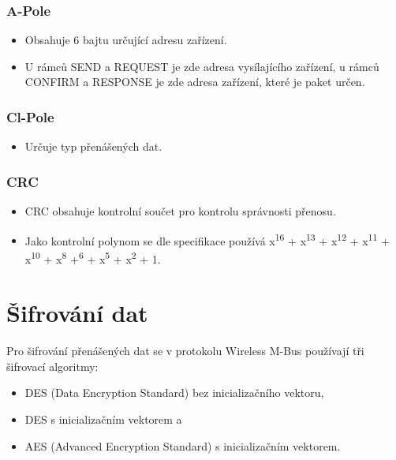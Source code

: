 \subsubsection{A-Pole}
\begin{itemize}
	\item Obsahuje 6 bajtu určující adresu zařízení.
	\item U rámců SEND a REQUEST je zde adresa vysílajícího zařízení, u rámců CONFIRM a RESPONSE je zde adresa zařízení, které je paket určen.
\end{itemize}

\subsubsection{Cl-Pole}
\begin{itemize}
	\item Určuje typ přenášených dat.
\end{itemize}



\subsubsection{CRC}
\begin{itemize}
	\item CRC obsahuje kontrolní součet pro kontrolu správnosti přenosu. 
	\item Jako kontrolní polynom se dle specifikace používá x\textsuperscript{16} + x\textsuperscript{13} + x\textsuperscript{12} + x\textsuperscript{11} + x\textsuperscript{10} + x\textsuperscript{8} +\textsuperscript{6} + x\textsuperscript{5} + x\textsuperscript{2} + 1.
\end{itemize}



\section{Šifrování dat}

Pro šifrování přenášených dat se v protokolu Wireless M-Bus používají tři šifrovací algoritmy:
\begin{itemize}
	\item DES (Data Encryption Standard) bez inicializačního vektoru,
	\item DES s inicializačním vektorem a
	\item AES (Advanced Encryption Standard) s inicializačním vektorem.
\end{itemize}

